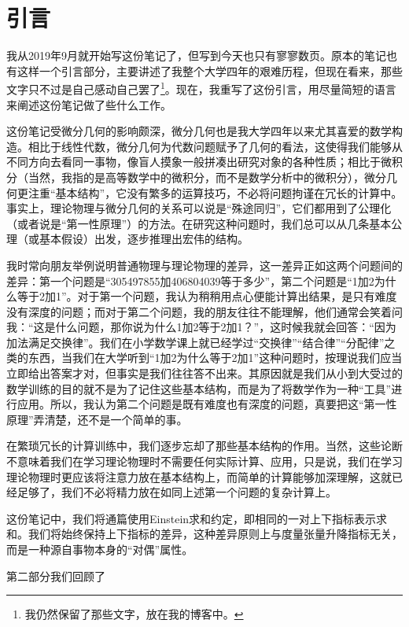 \part{引言}
    我从2019年9月就开始写这份笔记了，但写到今天也只有寥寥数页。原本的笔记也有这样一个引言部分，主要讲述了我整个大学四年的艰难历程，但现在看来，那些文字只不过是自己感动自己罢了\footnote{我仍然保留了那些文字，放在我的博客中。}。现在，我重写了这份引言，用尽量简短的语言来阐述这份笔记做了些什么工作。
	
    这份笔记受微分几何的影响颇深，微分几何也是我大学四年以来尤其喜爱的数学构造。相比于线性代数，微分几何为代数问题赋予了几何的看法，这使得我们能够从不同方向去看同一事物，像盲人摸象一般拼凑出研究对象的各种性质；相比于微积分（当然，我指的是高等数学中的微积分，而不是数学分析中的微积分），微分几何更注重“基本结构”，它没有繁多的运算技巧，不必将问题拘谨在冗长的计算中。事实上，理论物理与微分几何的关系可以说是“殊途同归”，它们都用到了公理化（或者说是“第一性原理”）的方法。在研究这种问题时，我们总可以从几条基本公理（或基本假设）出发，逐步推理出宏伟的结构。
		
    我时常向朋友举例说明普通物理与理论物理的差异，这一差异正如这两个问题间的差异：第一个问题是“305497855加406804039等于多少”，第二个问题是“1加2为什么等于2加1”。对于第一个问题，我认为稍稍用点心便能计算出结果，是只有难度没有深度的问题；而对于第二个问题，我的朋友往往不能理解，他们通常会笑着问我：“这是什么问题，那你说为什么1加2等于2加1？”，这时候我就会回答：“因为加法满足交换律”。我们在小学数学课上就已经学过“交换律”“结合律”“分配律”之类的东西，当我们在大学听到“1加2为什么等于2加1”这种问题时，按理说我们应当立即给出答案才对，但事实是我们往往答不出来。其原因就是我们从小到大受过的数学训练的目的就不是为了记住这些基本结构，而是为了将数学作为一种“工具”进行应用。所以，我认为第二个问题是既有难度也有深度的问题，真要把这“第一性原理”弄清楚，还不是一个简单的事。
		
    在繁琐冗长的计算训练中，我们逐步忘却了那些基本结构的作用。当然，这些论断不意味着我们在学习理论物理时不需要任何实际计算、应用，只是说，我们在学习理论物理时更应该将注意力放在基本结构上，而简单的计算能够加深理解，这就已经足够了，我们不必将精力放在如同上述第一个问题的复杂计算上。

    这份笔记中，我们将通篇使用Einstein求和约定，即相同的一对上下指标表示求和。我们将始终保持上下指标的差异，这种差异原则上与度量张量升降指标无关，而是一种源自事物本身的“对偶”属性。

    第二部分我们回顾了